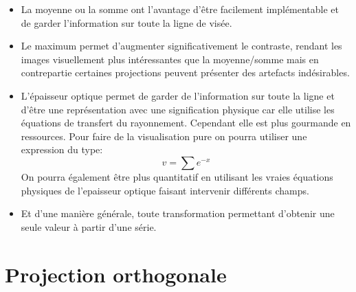 \begin{itemize}
\item La moyenne ou la somme ont l'avantage d'être facilement implémentable et de garder l'information sur toute la ligne de visée.

\item Le maximum permet d'augmenter significativement le contraste, rendant les images visuellement plus intéressantes que la moyenne/somme mais en contrepartie certaines projections peuvent présenter des artefacts indésirables.

\item L'épaisseur optique permet de garder de l'information sur toute la ligne et d'être une représentation avec une signification physique car elle utilise les équations de transfert du rayonnement.
Cependant elle est plus gourmande en ressources.
Pour faire de la visualisation pure on pourra utiliser une expression du type:
\begin{equation}
v= \sum e^{-x}
\label{eq:epop}
\end{equation}
On pourra également être plus quantitatif en utilisant les vraies équations physiques de l'epaisseur optique faisant intervenir différents champs. %

\item Et d'une manière générale, toute transformation permettant d'obtenir une seule valeur à partir d'une série.

\end{itemize}




\section{Projection orthogonale}

